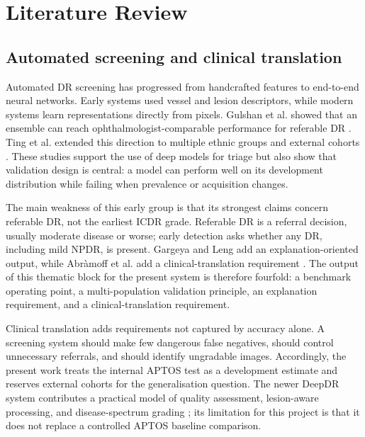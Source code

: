 \documentclass[11pt,a4paper]{article}
\begin{document}
\section{Literature Review}
\subsection{Automated screening and clinical translation}
Automated DR screening has progressed from handcrafted features to end-to-end neural networks. Early systems used vessel and lesion descriptors, while modern systems learn representations directly from pixels. Gulshan et al. showed that an ensemble can reach ophthalmologist-comparable performance for referable DR \cite{gulshan2016}. Ting et al. extended this direction to multiple ethnic groups and external cohorts \cite{ting2017}. These studies support the use of deep models for triage but also show that validation design is central: a model can perform well on its development distribution while failing when prevalence or acquisition changes.

The main weakness of this early group is that its strongest claims concern referable DR, not the earliest ICDR grade. Referable DR is a referral decision, usually moderate disease or worse; early detection asks whether any DR, including mild NPDR, is present. Gargeya and Leng add an explanation-oriented output, while Abràmoff et al. add a clinical-translation requirement \cite{gargeya2017,abramoff2018}. The output of this thematic block for the present system is therefore fourfold: a benchmark operating point, a multi-population validation principle, an explanation requirement, and a clinical-translation requirement.

Clinical translation adds requirements not captured by accuracy alone. A screening system should make few dangerous false negatives, should control unnecessary referrals, and should identify ungradable images. Accordingly, the present work treats the internal APTOS test as a development estimate and reserves external cohorts for the generalisation question. The newer DeepDR system contributes a practical model of quality assessment, lesion-aware processing, and disease-spectrum grading \cite{deepdr2021}; its limitation for this project is that it does not replace a controlled APTOS baseline comparison.
\end{document}
